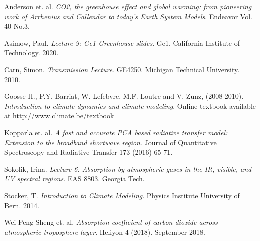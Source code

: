 \documentclass[12pt]{article} %
\begin{document}
Anderson et. al. \textit{CO2, the greenhouse effect and global warming: from pioneering work of Arrhenius and Callendar to today's Earth System Models}. Endeavor Vol. 40 No.3. 

Asimow, Paul. \textit{Lecture 9: Ge1 Greenhouse slides}. Ge1. California Institute of Technology. 2020.

Carn, Simon. \textit{Transmission Lecture}. GE4250. Michigan Technical University. 2010.

Goosse H., P.Y. Barriat, W. Lefebvre, M.F. Loutre and V. Zunz, (2008-2010). \textit{Introduction to climate dynamics and climate modeling}. Online textbook available at http://www.climate.be/textbook

Kopparla et. al. \textit{A fast and accurate PCA based radiative transfer model: Extension to the broadband shortwave region}. Journal of Quantitative Spectroscopy and Radiative Transfer 173 (2016) 65-71.

Sokolik, Irina. \textit{Lecture 6. Absorption by atmospheric gases in the IR, visible, and UV spectral regions}. EAS 8803. Georgia Tech.

Stocker, T. \textit{Introduction to Climate Modeling}. Physics Institute University of Bern. 2014.

Wei Peng-Sheng et. al. \textit{Absorption coefficient of carbon dioxide across atmospheric troposphere layer}. Heliyon 4 (2018). September 2018.
\end{document}
